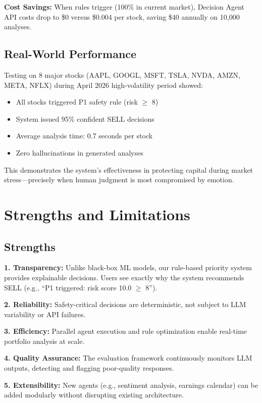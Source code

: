 \documentclass[11pt,letterpaper]{article}
\begin{document}
\textbf{Cost Savings:} When rules trigger (100\% in current market), Decision Agent API costs drop to \$0 versus \$0.004 per stock, saving \$40 annually on 10,000 analyses.

\subsection{Real-World Performance}

Testing on 8 major stocks (AAPL, GOOGL, MSFT, TSLA, NVDA, AMZN, META, NFLX) during April 2026 high-volatility period showed:

\begin{itemize}
    \item All stocks triggered P1 safety rule (risk $\geq$ 8)
    \item System issued 95\% confident SELL decisions
    \item Average analysis time: 0.7 seconds per stock
    \item Zero hallucinations in generated analyses
\end{itemize}

This demonstrates the system's effectiveness in protecting capital during market stress—precisely when human judgment is most compromised by emotion.

\section{Strengths and Limitations}

\subsection{Strengths}

\textbf{1. Transparency:} Unlike black-box ML models, our rule-based priority system provides explainable decisions. Users see exactly why the system recommends SELL (e.g., ``P1 triggered: risk score 10.0 $\geq$ 8'').

\textbf{2. Reliability:} Safety-critical decisions are deterministic, not subject to LLM variability or API failures.

\textbf{3. Efficiency:} Parallel agent execution and rule optimization enable real-time portfolio analysis at scale.

\textbf{4. Quality Assurance:} The evaluation framework continuously monitors LLM outputs, detecting and flagging poor-quality responses.

\textbf{5. Extensibility:} New agents (e.g., sentiment analysis, earnings calendar) can be added modularly without disrupting existing architecture.
\end{document}
